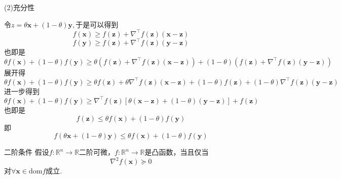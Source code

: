 (2)充分性

令$z=\theta\boldsymbol{x}+(1-\theta)\boldsymbol{y},$于是可以得到
$$
f\left( \boldsymbol{x} \right) \geqslant f\left( \boldsymbol{z} \right) +\nabla ^{\top}f\left( \boldsymbol{z} \right) \left( \boldsymbol{x}-\boldsymbol{z} \right)~
$$
$$
f\left( \boldsymbol{y} \right) \geqslant f\left( \boldsymbol{z} \right) +\nabla ^{\top}f\left( \boldsymbol{z} \right) \left( \boldsymbol{y}-\boldsymbol{z} \right)~
$$
也即是
$$
\theta f\left( \boldsymbol{x} \right) +\left( 1-\theta \right) f\left( \boldsymbol{y} \right) \geqslant \theta \left( f\left( \boldsymbol{z} \right) +\nabla ^{\top}f\left( \boldsymbol{z} \right) \left( \boldsymbol{x}-\boldsymbol{z} \right) \right) +\left( 1-\theta \right) \left( f\left( \boldsymbol{z} \right) +\nabla ^{\top}f\left( \boldsymbol{z} \right) \left( \boldsymbol{y}-\boldsymbol{z} \right) \right)~
$$
展开得
$$
\theta f\left( \boldsymbol{x} \right) +\left( 1-\theta \right) f\left( \boldsymbol{y} \right) \geqslant \theta f\left( \boldsymbol{z} \right) +\theta \nabla ^{\top}f\left( \boldsymbol{z} \right) \left( \boldsymbol{x}-\boldsymbol{z} \right) +\left( 1-\theta \right) f\left( \boldsymbol{z} \right) +\left( 1-\theta \right) \nabla ^{\top}f\left( \boldsymbol{z} \right) \left( \boldsymbol{y}-\boldsymbol{z} \right)~
$$
进一步得到
$$
\theta f\left( \boldsymbol{x} \right) +\left( 1-\theta \right) f\left( \boldsymbol{y} \right) \geqslant \nabla ^{\top}f\left( \boldsymbol{z} \right) \left[ \theta \left( \boldsymbol{x}-\boldsymbol{z} \right) +\left( 1-\theta \right) \left( \boldsymbol{y}-\boldsymbol{z} \right) \right] +f\left( \boldsymbol{z} \right)~
$$
也即是
$$
f\left( \boldsymbol{z} \right) \leqslant \theta f\left( \boldsymbol{x} \right) +\left( 1-\theta \right) f\left( \boldsymbol{y} \right)~
$$
即
$$
f\left( \theta \boldsymbol{x}+\left( 1-\theta \right) \boldsymbol{y} \right) \leqslant \theta f\left( \boldsymbol{x} \right) +\left( 1-\theta \right) f\left( \boldsymbol{y} \right)~
$$


\begin{theorem}{二阶条件}
假设$f:\mathbb{R}^n\to\mathbb{R}$二阶可微，$f:\mathbb{R}^n\to\mathbb{R}$是凸函数，当且仅当
\begin{equation}
\nabla^2 f(\boldsymbol{x})\succeq 0~
\end{equation}
对$\forall\boldsymbol{x}\in\mathrm{dom} f$成立.
\end{theorem}
